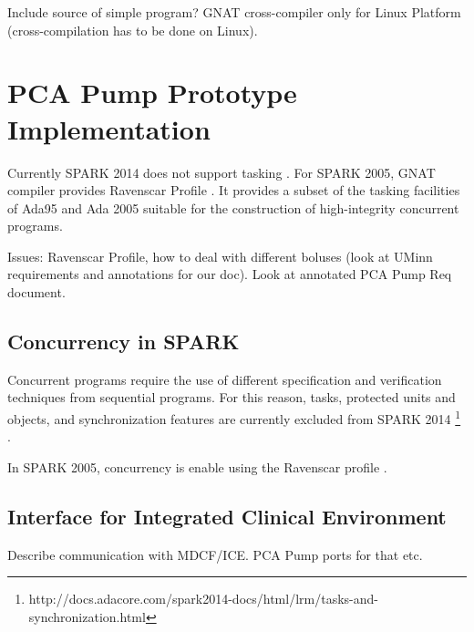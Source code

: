 Include source of simple program?
GNAT cross-compiler only for Linux Platform (cross-compilation has to be done on Linux).


\section{PCA Pump Prototype Implementation}
\label{pcapump:implementation}

Currently SPARK 2014 does not support tasking \cite{Spark2014refManual:Online}. For SPARK 2005, GNAT compiler provides Ravenscar Profile \cite{Ravenscar:Online}. It provides a subset of the tasking facilities of Ada95 and Ada 2005 suitable for the construction of high-integrity concurrent programs.

Issues: Ravenscar Profile, how to deal with different boluses (look at UMinn requirements and annotations for our doc).
Look at annotated PCA Pump Req document.

\subsection{Concurrency in SPARK}
\label{pcapump:implementation:concurrency}

Concurrent programs require the use of different specification and verification techniques from sequential programs. For this reason, tasks, protected units and objects, and synchronization features are currently excluded from SPARK 2014 \footnote{http://docs.adacore.com/spark2014-docs/html/lrm/tasks-and-synchronization.html} \cite{Spark2014refManual:Online}.

In SPARK 2005, concurrency is enable using the Ravenscar profile \cite{Ravenscar:Online}. 

\cite{Ravenscar:Article}

\subsection{Interface for Integrated Clinical Environment}
\label{pcapump:implementation:ice}

Describe communication with MDCF/ICE. PCA Pump ports for that etc.